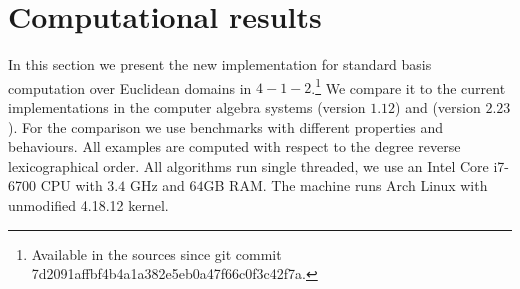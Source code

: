 \section{Computational results}
\label{sec:results}
In this section we present the new implementation for standard basis computation
over Euclidean domains in \singular $4-1-2$.\footnote{Available in the \singular
sources since git commit 7d2091affbf4b4a1a382e5eb0a47f66c0f3c42f7a.}
We compare it to the current implementations in the
computer algebra systems \macaulay (version $1.12$) and \magma (version $2.23$).
For the comparison we use benchmarks with different properties and behaviours.
All examples are computed with respect to the degree reverse lexicographical order.
All algorithms run single threaded, we use an Intel Core i7-6700 CPU with $3.4$ GHz
and $64$GB RAM. The machine runs Arch Linux with unmodified 4.18.12 kernel.

